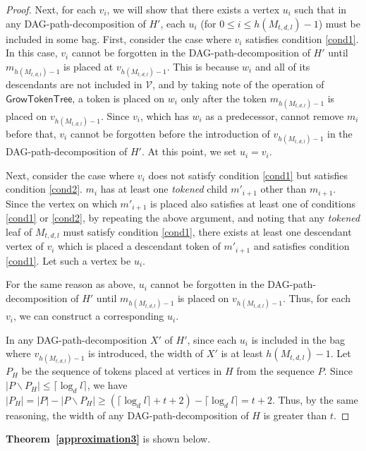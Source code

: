 \documentclass[runningheads]{llncs}
\theoremstyle{plain}
\theoremstyle{definition}
\begin{document}
\begin{proof}
    Next, for each $v_i$, we will show that there exists a vertex $u_i$ such that in any DAG-path-decomposition of $H'$, each $u_i$ (for $0 \leq i \leq h(M_{t, d, l})-1$) must be included in some bag. First, consider the case where $v_i$ satisfies condition \ref{cond1}. In this case, $v_i$ cannot be forgotten in the DAG-path-decomposition of $H'$ until $m_{h(M_{t, d, l})-1}$ is placed at $v_{h(M_{t, d, l})-1}$. This is because $w_i$ and all of its descendants are not included in $\mathcal{V}$, and by taking note of the operation of $\mathsf{GrowTokenTree}$, a token is placed on $w_i$ only after the token $m_{h(M_{t, d, l})-1}$ is placed on $v_{h(M_{t, d, l})-1}$. Since $v_i$, which has $w_i$ as a predecessor, cannot remove $m_i$ before that, $v_i$ cannot be forgotten before the introduction of $v_{h(M_{t, d, l})-1}$ in the DAG-path-decomposition of $H'$. At this point, we set $u_i = v_i$. 
    
    Next, consider the case where $v_i$ does not satisfy condition \ref{cond1} but satisfies condition \ref{cond2}.  
    $m_i$ has at least one \textit{tokened} child $m'_{i+1}$ other than $m_{i+1}$.  
    Since the vertex on which $m'_{i+1}$ is placed also satisfies at least one of conditions \ref{cond1} or \ref{cond2}, by repeating the above argument, and noting that any \textit{tokened} leaf of $M_{t, d, l}$ must satisfy condition \ref{cond1}, there exists at least one descendant vertex of $v_i$ which is placed a descendant token of $m'_{i+1}$ and satisfies condition \ref{cond1}. Let such a vertex be $u_i$.  
    
    For the same reason as above, $u_i$ cannot be forgotten in the DAG-path-decomposition of $H'$ until $m_{h(M_{t, d, l})-1}$ is placed on $v_{h(M_{t, d, l})-1}$. Thus, for each $v_i$, we can construct a corresponding $u_i$.  
    
    In any DAG-path-decomposition $X'$ of $H'$, since each $u_i$ is included in the bag where $v_{h(M_{t, d, l})-1}$ is introduced, the width of $X'$ is at least $h(M_{t, d, l})-1$. Let $P_H$ be the sequence of tokens placed at vertices in $H$ from the sequence $P$. Since $|P \backslash P_H| \leq \lceil \log_d l \rceil$, we have $|P_H| = |P| - |P \backslash P_H| \geq (\lceil \log_d l \rceil + t + 2) - \lceil \log_d l \rceil = t + 2$. Thus, by the same reasoning, the width of any DAG-path-decomposition of $H$ is greater than $t$.
    

\end{proof}

\textbf{Theorem~\ref{approximation3}} is shown below.
\end{document}
